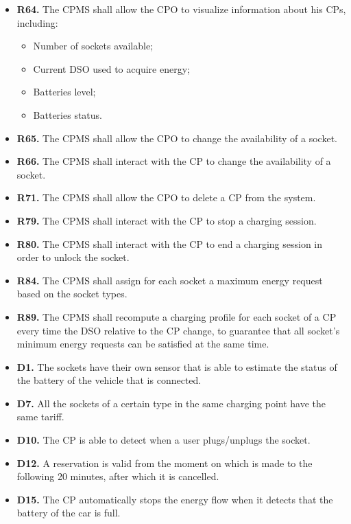\documentclass{Configuration_Files/PoliMi3i_thesis}
\begin{document}
\begin{enumerate}[label=\textbf{G\arabic*}]
\begin{itemize}
            \item \textbf{R64.} The CPMS shall allow the CPO to visualize information about his CPs, including:
                \begin{itemize}
                    \item Number of sockets available;
                    \item Current DSO used to acquire energy;
                    \item Batteries level;
                    \item Batteries status.
                \end{itemize}
            \item \textbf{R65.} The CPMS shall allow the CPO to change the availability of a socket.
            \item \textbf{R66.} The CPMS shall interact with the CP to change the availability of a socket.
            \item \textbf{R71.} The CPMS shall allow the CPO to delete a CP from the system.
            \item \textbf{R79.} The CPMS shall interact with the CP to stop a charging session.
            \item \textbf{R80.} The CPMS shall interact with the CP to end a charging session in order to unlock the socket.
            \item \textbf{R84.} The CPMS shall assign for each socket a maximum energy request based on the socket types.
            \item \textbf{R89.} The CPMS shall recompute a charging profile for each socket of a CP every time the DSO relative to the CP change, to guarantee that all socket's minimum energy requests can be satisfied at the same time.
            \item \textbf{D1.} The sockets have their own sensor that is able to estimate the status of the battery of the vehicle that is connected.
            \item \textbf{D7.} All the sockets of a certain type in the same charging point have the same tariff.
            \item \textbf{D10.} The CP is able to detect when a user plugs/unplugs the socket.
            \item \textbf{D12.} A reservation is valid from the moment on which is made to the following 20 minutes, after which it is cancelled.
            \item \textbf{D15.} The CP automatically stops the energy flow when it detects that the battery of the car is full.
        \end{itemize}

\end{enumerate}
\end{document}
